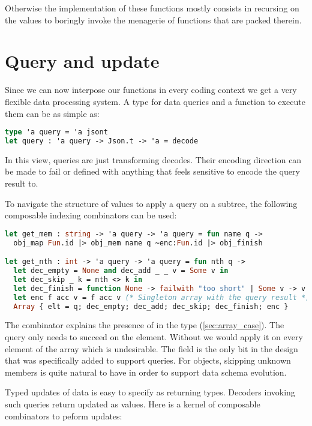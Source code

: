 \documentclass[nolinenum]{jfp}
\begin{document}
Otherwise the implementation of these functions mostly consists in
recursing on the  values to boringly invoke the menagerie
of functions that are packed therein.

\section{Query and update}
\label{sec:queryx}

Since we can now interpose our functions in every coding context we
get a very flexible data processing system. A type for data queries
and a function to execute them can be as simple as:

\begin{lstlisting}[language=ocaml]
type 'a query = 'a jsont
let query : 'a query -> Json.t -> 'a = decode
\end{lstlisting}
%
In this view, queries are just transforming decodes. Their encoding
direction can be made to fail or defined with anything that feels
sensitive to encode the query result to.

To navigate the structure of \json{} values to apply a query on a
subtree, the following composable indexing combinators can be used:

\begin{lstlisting}[language=ocaml]
let get_mem : string -> 'a query -> 'a query = fun name q ->
  obj_map Fun.id |> obj_mem name q ~enc:Fun.id |> obj_finish

let get_nth : int -> 'a query -> 'a query = fun nth q ->
  let dec_empty = None and dec_add _ _ v = Some v in
  let dec_skip _ k = nth <> k in
  let dec_finish = function None -> failwith "too short" | Some v -> v in
  let enc f acc v = f acc v (* Singleton array with the query result *) in
  Array { elt = q; dec_empty; dec_add; dec_skip; dec_finish; enc }
\end{lstlisting}
%
The  combinator explains the presence of 
in the  type (\autoref{sec:array_case}). The query
 only needs to succeed on the  element. Without
 we would apply it on every element of the array which
is undesirable. The  field is the only bit in the
design that was specifically added to support queries. For objects,
skipping unknown members is quite natural to have in order to support data
schema evolution.

Typed updates of \json{} data is easy to specify as 
returning \json{} types. Decoders invoking such queries return updated
\json{} as  values. Here is a kernel of composable
combinators to peform updates:
\end{document}
